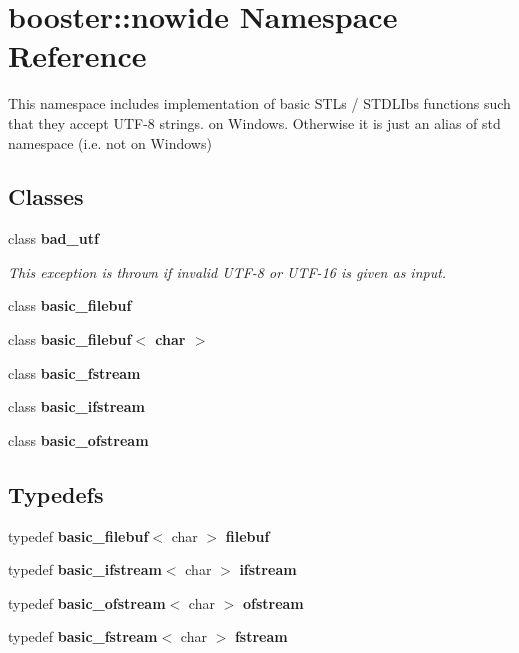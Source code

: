 \section{booster\+:\+:nowide Namespace Reference}
\label{namespacebooster_1_1nowide}


This namespace includes implementation of basic S\+TL\textquotesingle{}s / S\+T\+D\+L\+Ib\textquotesingle{}s functions such that they accept U\+T\+F-\/8 strings. on Windows. Otherwise it is just an alias of std namespace (i.\+e. not on Windows)  


\subsection*{Classes}
\begin{DoxyCompactItemize}
\item 
class {\bf bad\+\_\+utf}
\begin{DoxyCompactList}\small\item\em This exception is thrown if invalid U\+T\+F-\/8 or U\+T\+F-\/16 is given as input. \end{DoxyCompactList}\item 
class {\bf basic\+\_\+filebuf}
\item 
class {\bf basic\+\_\+filebuf$<$ char $>$}
\item 
class {\bf basic\+\_\+fstream}
\item 
class {\bf basic\+\_\+ifstream}
\item 
class {\bf basic\+\_\+ofstream}
\end{DoxyCompactItemize}
\subsection*{Typedefs}
\begin{DoxyCompactItemize}
\item 
typedef {\bf basic\+\_\+filebuf}$<$ char $>$ {\bf filebuf}
\item 
typedef {\bf basic\+\_\+ifstream}$<$ char $>$ {\bf ifstream}
\item 
typedef {\bf basic\+\_\+ofstream}$<$ char $>$ {\bf ofstream}
\item 
typedef {\bf basic\+\_\+fstream}$<$ char $>$ {\bf fstream}
\end{DoxyCompactItemize}
